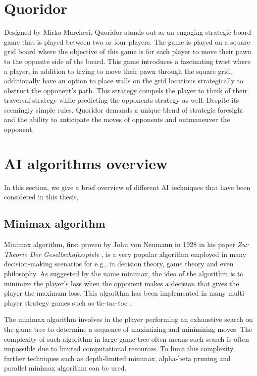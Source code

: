 \section{Quoridor}

Designed by Mirko Marchesi, Quoridor stands out as an engaging strategic board game that is played between two or four players. The game is played on a square grid board where the objective of this game is for each player to move their pawn to the opposite side of the board. This game introduces a fascinating twist where a player, in addition to trying to move their pawn through the square grid, additionally have an option to place walls on the grid locations strategically to obstruct the opponent's path. This strategy compels the player to think of their traversal strategy while predicting the opponents strategy as well. Despite its seemingly simple rules, Quoridor demands a unique blend of strategic foresight and the ability to anticipate the moves of opponents and outmaneuver the opponent.


\section{AI algorithms overview}
In this section, we give a brief overview of different \ac{AI} techniques that have been considered in this thesis.

\subsection{Minimax algorithm}
Minimax algorithm, first proven by John von Neumann in 1928 in his paper \textit{Zur Theorie Der Gesellschaftsspiele} \citep{v1928theorie}, is a very popular algorithm employed in many decision-making scenarios for e.g., in decision theory, game theory and even philosophy. As suggested by the name minimax, the idea of the algorithm is to minimize the player's loss when the opponent makes a decision that gives the player the maximum loss. This algorithm has been implemented in many multi-player strategy games such as tic-tac-toe \citep{savelli2008tic}. 

The minimax algorithm involves in the player performing an exhaustive search on the game tree to determine a sequence of maximizing and minimizing moves. The complexity of such algorithm in large game tree often means such search is often impossible due to limited computational resources. To limit this complexity, further techniques such as depth-limited minimax, alpha-beta pruning and parallel minimax algorithm can be used.

